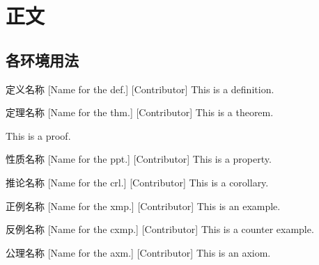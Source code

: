 \documentclass[UTF8]{ctexart}
\begin{document}
\section{正文}

\subsection{各环境用法}

    \begin{dfn}
        [UUID]
        {定义名称}
        [Name for the def.]
        [Contributor]
        This is a definition. 
    \end{dfn}

    \begin{thm}
        [UUID]
        {定理名称}
        [Name for the thm.]
        [Contributor]
        This is a theorem. 
    \end{thm}

    \begin{prf}
        This is a proof. 
    \end{prf}

    \begin{ppt}
        [UUID]
        {性质名称}
        [Name for the ppt.]
        [Contributor]
        This is a property. 
    \end{ppt}

    \begin{crl}
        [UUID]
        {推论名称}
        [Name for the crl.]
        [Contributor]
        This is a corollary. 
    \end{crl}

    \begin{xmp}
        [UUID]
        {正例名称}
        [Name for the xmp.]
        [Contributor]
        This is an example. 
    \end{xmp}

    \begin{cxmp}
        [UUID]
        {反例名称}
        [Name for the cxmp.]
        [Contributor]
        This is a counter example. 
    \end{cxmp}

    \begin{axm}
        [UUID]
        {公理名称}
        [Name for the axm.]
        [Contributor]
        This is an axiom.
    \end{axm}
    
\end{document}
